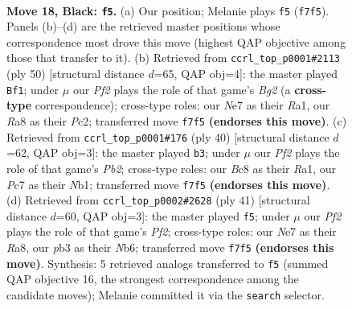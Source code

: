 \documentclass[11pt]{article}
\begin{document}
\clearpage

\begin{figure}[p]\centering
\begin{subfigure}{0.46\textwidth}\centering
\resizebox{\linewidth}{!}{%
\newchessgame
\chessboard[
  setfen={r1b3k1/ppppnp1p/8/6p1/8/1PN2P2/P1PPBKPP/R7 b - - 1 18},
  showmover=false,
  pgfstyle=straightmove, color=movearrow, markmove={f7-f5}
]}
\caption{}
\end{subfigure}\hfill
\begin{subfigure}{0.46\textwidth}\centering
\resizebox{\linewidth}{!}{%
\newchessgame
\chessboard[
  setfen={1r6/3n1pkp/1p2b1p1/2p5/2P5/4NPP1/2P3BP/R5K1 w - - 0 26},
  showmover=false,
  pgfstyle=straightmove, color=movearrow, markmove={g2-f1}
]}
\caption{}
\end{subfigure}
\\[4pt]
\begin{subfigure}{0.46\textwidth}\centering
\resizebox{\linewidth}{!}{%
\newchessgame
\chessboard[
  setfen={r1b1k3/5p1p/p5p1/B1ppn3/8/4P3/PP3PPP/RN4K1 w - - 2 21},
  showmover=false,
  pgfstyle=straightmove, color=movearrow, markmove={b2-b3}
]}
\caption{}
\end{subfigure}\hfill
\begin{subfigure}{0.46\textwidth}\centering
\resizebox{\linewidth}{!}{%
\newchessgame
\chessboard[
  setfen={r3kb2/p1p2p2/1n4p1/2p4p/4N3/2B1P1P1/PP2KP1P/R7 b q - 0 21},
  showmover=false,
  pgfstyle=straightmove, color=movearrow, markmove={f7-f5}
]}
\caption{}
\end{subfigure}
\caption{\textbf{Move 18, Black: \texttt{f5}.} (a) Our position; Melanie plays \texttt{f5} (\texttt{f7f5}). Panels (b)--(d) are the retrieved master positions whose correspondence most drove this move (highest QAP objective among those that transfer to it). (b) Retrieved from \texttt{ccrl\_top\_p0001\#2113} (ply 50) [structural distance $d$=65, QAP obj=4]: the master played \texttt{Bf1}; under $\mu$ our \emph{Pf2} plays the role of that game's \emph{Bg2} (a \textbf{cross-type} correspondence); cross-type roles: our \emph{N}e7 as their \emph{R}a1, our \emph{R}a8 as their \emph{P}c2; transferred move \texttt{f7f5} \textbf{(endorses this move)}. (c) Retrieved from \texttt{ccrl\_top\_p0001\#176} (ply 40) [structural distance $d$=62, QAP obj=3]: the master played \texttt{b3}; under $\mu$ our \emph{Pf2} plays the role of that game's \emph{Pb2}; cross-type roles: our \emph{B}c8 as their \emph{R}a1, our \emph{P}c7 as their \emph{N}b1; transferred move \texttt{f7f5} \textbf{(endorses this move)}. (d) Retrieved from \texttt{ccrl\_top\_p0002\#2628} (ply 41) [structural distance $d$=60, QAP obj=3]: the master played \texttt{f5}; under $\mu$ our \emph{Pf2} plays the role of that game's \emph{Pf2}; cross-type roles: our \emph{N}e7 as their \emph{R}a8, our \emph{p}b3 as their \emph{N}b6; transferred move \texttt{f7f5} \textbf{(endorses this move)}. Synthesis: 5 retrieved analogs transferred to \texttt{f5} (summed QAP objective 16, the strongest correspondence among the candidate moves); Melanie committed it via the \texttt{search} selector.}
\label{fig:thought-m35}
\end{figure}
\end{document}
